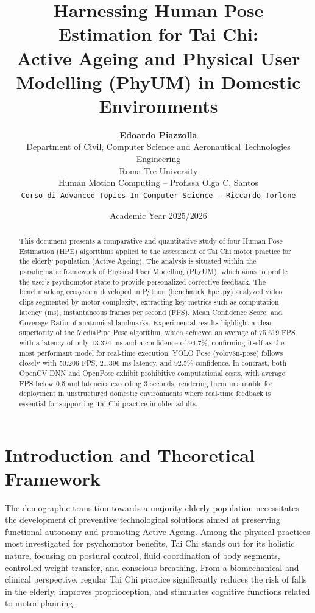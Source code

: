 \documentclass[a4paper,11pt]{article}
\title{\textbf{Harnessing Human Pose Estimation for Tai Chi:\\Active Ageing and Physical User Modelling (PhyUM) in Domestic Environments}}
\author{\textbf{Edoardo Piazzolla}\\
Department of Civil, Computer Science and Aeronautical Technologies Engineering\\
Roma Tre University\\
Human Motion Computing -- Prof.ssa Olga C. Santos\\
\texttt{Corso di Advanced Topics In Computer Science -- Riccardo Torlone}}
\date{Academic Year 2025/2026}
\begin{document}
\maketitle

\begin{abstract}
This document presents a comparative and quantitative study of four Human Pose Estimation (HPE) algorithms applied to the assessment of Tai Chi motor practice for the elderly population (Active Ageing). The analysis is situated within the paradigmatic framework of Physical User Modelling (PhyUM), which aims to profile the user's psychomotor state to provide personalized corrective feedback. The benchmarking ecosystem developed in Python (\texttt{benchmark\_hpe.py}) analyzed video clips segmented by motor complexity, extracting key metrics such as computation latency (ms), instantaneous frames per second (FPS), Mean Confidence Score, and Coverage Ratio of anatomical landmarks. Experimental results highlight a clear superiority of the MediaPipe Pose algorithm, which achieved an average of 75.619 FPS with a latency of only 13.324 ms and a confidence of 94.7\%, confirming itself as the most performant model for real-time execution. YOLO Pose (yolov8n-pose) follows closely with 50.206 FPS, 21.396 ms latency, and 92.5\% confidence. In contrast, both OpenCV DNN and OpenPose exhibit prohibitive computational costs, with average FPS below 0.5 and latencies exceeding 3 seconds, rendering them unsuitable for deployment in unstructured domestic environments where real-time feedback is essential for supporting Tai Chi practice in older adults.
\end{abstract}

\newpage

\section{Introduction and Theoretical Framework}

The demographic transition towards a majority elderly population necessitates the development of preventive technological solutions aimed at preserving functional autonomy and promoting Active Ageing. Among the physical practices most investigated for psychomotor benefits, Tai Chi stands out for its holistic nature, focusing on postural control, fluid coordination of body segments, controlled weight transfer, and conscious breathing. From a biomechanical and clinical perspective, regular Tai Chi practice significantly reduces the risk of falls in the elderly, improves proprioception, and stimulates cognitive functions related to motor planning.
\end{document}
